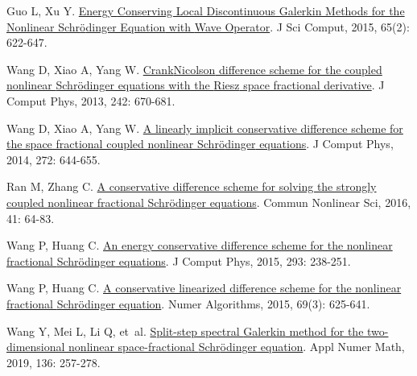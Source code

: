 \begin{thebibliography}{79}
    Guo L, Xu Y.
    \newblock \href{http://link.springer.com/10.1007/s10915-014-9977-z}{Energy {{Conserving Local Discontinuous Galerkin Methods}} for the {{Nonlinear Schr{\"o}dinger Equation}} with {{Wave Operator}}}\allowbreak[J].
    \newblock J Sci Comput, 2015, 65\allowbreak (2): 622-647.
    
    Wang D, Xiao A, Yang W.
    \newblock \href{https://www.sciencedirect.com/science/article/pii/S0021999113001563}{Crank{\textendash}{{Nicolson}} difference scheme for the coupled nonlinear {{Schr{\"o}dinger}} equations with the {{Riesz}} space fractional derivative}\allowbreak[J].
    \newblock J Comput Phys, 2013, 242: 670-681.
    
    Wang D, Xiao A, Yang W.
    \newblock \href{https://www.sciencedirect.com/science/article/pii/S0021999114003167}{A linearly implicit conservative difference scheme for the space fractional coupled nonlinear {{Schr{\"o}dinger}} equations}\allowbreak[J].
    \newblock J Comput Phys, 2014, 272: 644-655.
    
    Ran M, Zhang C.
    \newblock \href{https://linkinghub.elsevier.com/retrieve/pii/S1007570416301289}{A conservative difference scheme for solving the strongly coupled nonlinear fractional {{Schr{\"o}dinger}} equations}\allowbreak[J].
    \newblock Commun Nonlinear Sci, 2016, 41: 64-83.
    
    Wang P, Huang C.
    \newblock \href{https://www.sciencedirect.com/science/article/pii/S0021999114002241}{An energy conservative difference scheme for the nonlinear fractional {{Schr{\"o}dinger}} equations}\allowbreak[J].
    \newblock J Comput Phys, 2015, 293: 238-251.
    
    Wang P, Huang C.
    \newblock \href{https://doi.org/10.1007/s11075-014-9917-x}{A conservative linearized difference scheme for the nonlinear fractional {{Schr{\"o}dinger}} equation}\allowbreak[J].
    \newblock Numer Algorithms, 2015, 69\allowbreak (3): 625-641.
    
    Wang Y, Mei L, Li Q, et~al.
    \newblock \href{https://linkinghub.elsevier.com/retrieve/pii/S0168927418302393}{Split-step spectral {{Galerkin}} method for the two-dimensional nonlinear space-fractional {{Schr{\"o}dinger}} equation}\allowbreak[J].
    \newblock Appl Numer Math, 2019, 136: 257-278.
    

\end{thebibliography}
